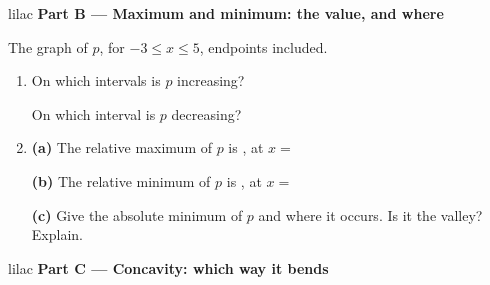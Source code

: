 \documentclass[10pt]{article}
\newcommand{\pcurve}{(-3,-3) .. controls (-2.6,0) and (-1.9,4) .. (-1,4)
  .. controls (1,4) and (1,-2) .. (3,-2) .. controls (3.8,-2) and (4.4,0) .. (5,3)}
\newcommand{\paxes}{%
  \draw[linegray, very thin, step=1] (-4,-4) grid (6,5);
  \draw[->, thick] (-4,0) -- (6.5,0) node[right] {\small $x$};
  \draw[->, thick] (0,-4) -- (0,5.5) node[above] {\small $p(x)$};
  \foreach \x in {-3,-2,-1,1,2,3,4,5} \node[below, font=\scriptsize] at (\x,0) {\x};
  \foreach \y in {-3,-2,-1,1,2,3,4} \node[left, font=\scriptsize] at (0,\y) {\y};}
\begin{document}
\vspace{0.14in}

\begin{headlinebox}{lilac}
\textbf{\color{plum}Part B --- Maximum and minimum: the value, and where}
\end{headlinebox}

\vspace{0.06in}

\noindent\begin{minipage}[t]{0.40\linewidth}
\vspace{0pt}
\centering
{}

{\footnotesize The graph of $p$, for $-3 \le x \le 5$, endpoints included.}
\end{minipage}\hfill
\begin{minipage}[t]{0.57\linewidth}
\vspace{0pt}
\begin{enumerate}[leftmargin=1.9em, itemsep=8pt, start=3]
\item On which intervals is $p$ increasing? \hfill {}

      On which interval is $p$ decreasing? \hfill {}

\item \textbf{(a)} The relative maximum of $p$ is , at $x = $ 

      \textbf{(b)} The relative minimum of $p$ is , at $x = $ 

      \textbf{(c)} Give the absolute minimum of $p$ and where it occurs. Is it the valley?
      Explain.
\end{enumerate}
\end{minipage}

\newpage

\begin{headlinebox}{lilac}
\textbf{\color{plum}Part C --- Concavity: which way it bends}
\end{headlinebox}
\end{document}
